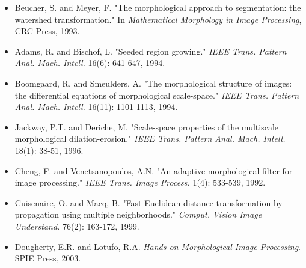 \documentclass[a4paper, 11pt]{article}
\begin{document}
\begin{itemize}
parallelization strategies." \textit{Fundam. Inform.} 41(1-2): 187-228, 2000.
\item Beucher, S. and Meyer, F. "The morphological approach to segmentation: the watershed
transformation." In \textit{Mathematical Morphology in Image Processing}, CRC Press, 1993.
\item Adams, R. and Bischof, L. "Seeded region growing." \textit{IEEE Trans. Pattern Anal.
Mach. Intell.} 16(6): 641-647, 1994.
\item Boomgaard, R. and Smeulders, A. "The morphological structure of images: the differential
equations of morphological scale-space." \textit{IEEE Trans. Pattern Anal. Mach. Intell.}
16(11): 1101-1113, 1994.
\item Jackway, P.T. and Deriche, M. "Scale-space properties of the multiscale morphological
dilation-erosion." \textit{IEEE Trans. Pattern Anal. Mach. Intell.} 18(1): 38-51, 1996.
\item Cheng, F. and Venetsanopoulos, A.N. "An adaptive morphological filter for image processing."
\textit{IEEE Trans. Image Process.} 1(4): 533-539, 1992.
\item Cuisenaire, O. and Macq, B. "Fast Euclidean distance transformation by propagation using
multiple neighborhoods." \textit{Comput. Vision Image Understand.} 76(2): 163-172, 1999.
\item Dougherty, E.R. and Lotufo, R.A. \textit{Hands-on Morphological Image Processing}.
SPIE Press, 2003.
\end{itemize}
\end{document}
